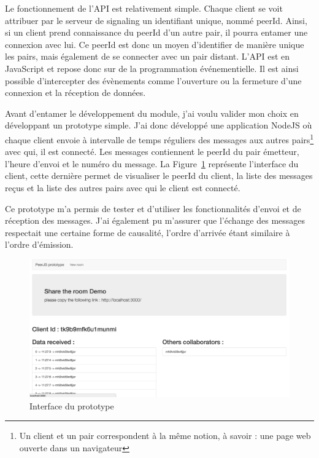 \documentclass{tnreport}
\begin{document}
Le fonctionnement de l'API est relativement simple. Chaque client se voit attribuer par le serveur de signaling un identifiant unique, nommé peerId. Ainsi, si un client prend connaissance du peerId d'un autre pair, il pourra entamer une connexion avec lui. Ce peerId est donc un moyen d'identifier de manière unique les pairs, mais également de se connecter avec un pair distant. L'API est en JavaScript et repose donc sur de la programmation événementielle. Il est ainsi possible d'intercepter des évènements comme l'ouverture ou la fermeture d'une connexion et la réception de données.  


Avant d'entamer le développement du module, j'ai voulu valider mon choix en développant un prototype simple. J'ai donc développé une application NodeJS où chaque client envoie à intervalle de temps réguliers des messages aux autres pairs\footnote{Un client et un pair correspondent à la même notion, à savoir : une page web ouverte dans un navigateur} avec qui, il est connecté. Les messages contiennent le peerId du pair émetteur, l'heure d'envoi et le numéro du message. La Figure~\ref{fig:proto-peerjs} représente l'interface du client, cette dernière permet de visualiser le peerId du client, la liste des messages reçus et la liste des autres pairs avec qui le client est connecté.

Ce prototype m'a permis de tester et d'utiliser les fonctionnalités d'envoi et de réception des messages. J'ai également pu m'assurer que l'échange des messages respectait une certaine forme de causalité, l'ordre d'arrivée étant similaire à l'ordre d'émission. 

\begin{figure}[!h]
  \centering
  \includegraphics[width=15cm]{figures/proto-peerjs}
  \caption{Interface du prototype}
  \label{fig:proto-peerjs}
\end{figure}
\end{document}
